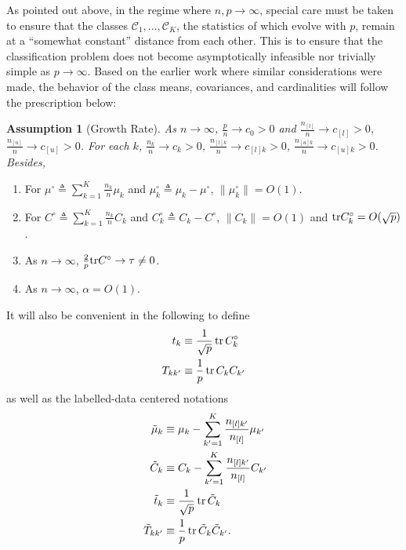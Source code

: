 \documentclass[twoside,11pt]{article}
\newcounter{cassumption}
\newtheorem{assumption}[cassumption]{Assumption}
\DeclareMathOperator{\tr}{{\rm tr}}
\begin{document}
As pointed out above, in the regime where $n,p\to\infty$, special care must be taken to ensure that the classes $\mathcal C_1,\ldots,\mathcal C_K$, the statistics of which evolve with $p$, remain at a ``somewhat constant'' distance from each other. This is to ensure that the classification problem does not become asymptotically infeasible nor trivially simple as $p\to\infty$. Based on the earlier work \citep{couillet2015kernel} where similar considerations were made, the behavior of the class means, covariances, and cardinalities will follow the prescription below:
\begin{assumption}[\label{Growth-Rate}Growth Rate]
	As $n\to\infty$, $\frac{p}{n}\rightarrow c_{0}>0$ and $\frac{n_{[l]}}n\to c_{[l]}>0$, $\frac{n_{[u]}}n\to c_{[u]}>0$. For each $k$, $\frac{n_{k}}{n}\to c_{k}>0$, $\frac{n_{[l]k}}{n}\to c_{[l]k}>0$, $\frac{n_{[u]k}}{n}\to c_{[u]k}>0$. Besides,
\end{assumption}
\begin{enumerate}
\item For $\mu^{\circ}\triangleq\sum_{k=1}^{K}\frac{n_{k}}{n}\mu_{k}$
and $\mu_{k}^{\circ}\triangleq\mu_{k}-\mu^{\circ}$, $\|\mu_{k}^{\circ}\|=O(1)$.
\item For $C^{\circ}\triangleq\sum_{k=1}^{K}\frac{n_{k}}{n}C_{k}$ and
$C_{k}^{\circ}\triangleq C_{k}-C^{\circ}$, $\|C_{k}\|=O(1)$ and $\text{{\rm tr}}C_{k}^{\circ}=O(\sqrt{p})$.
\item As $n\to\infty$, $\frac{2}{p}{\rm tr}C^{\circ}\rightarrow\tau\neq0$.
\item As $n\to\infty$, $\alpha=O(1)$.
\end{enumerate}
It will also be convenient in the following to define
\begin{align*}
	t_k &\equiv \frac1{\sqrt{p}}\tr C_k^\circ \\
	T_{kk'} &\equiv \frac1p\tr C_kC_{k'}
\end{align*}
as well as the labelled-data centered notations
\begin{align*}
	\tilde \mu_k &\equiv \mu_k - \sum_{k'=1}^K\frac{n_{[l]k'}}{n_{[l]}}\mu_{k'} \\
	\tilde C_k &\equiv C_k - \sum_{k'=1}^K\frac{n_{[l]k'}}{n_{[l]}}C_{k'} \\
	\tilde t_{k} &\equiv \frac1{\sqrt{p}}\tr \tilde C_k \\\
	\tilde T_{kk'} &\equiv \frac1p\tr \tilde C_k\tilde C_{k'}.
\end{align*}
\end{document}
